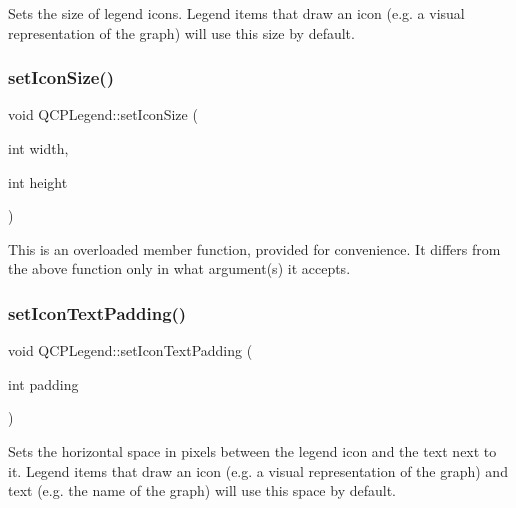 Sets the size of legend icons. Legend items that draw an icon (e.\+g. a visual representation of the graph) will use this size by default. \mbox{\label{class_q_c_p_legend_a96b1a37fd4ee6a9778e6e54fe56ab6c2}} 
\subsubsection{\texorpdfstring{set\+Icon\+Size()}{setIconSize()}\hspace{0.1cm}{\footnotesize\ttfamily [2/2]}}
{\footnotesize\ttfamily void Q\+C\+P\+Legend\+::set\+Icon\+Size (\begin{DoxyParamCaption}\item[{int}]{width,  }\item[{int}]{height }\end{DoxyParamCaption})}

This is an overloaded member function, provided for convenience. It differs from the above function only in what argument(s) it accepts. \mbox{\label{class_q_c_p_legend_a62973bd69d5155e8ea3141366e8968f6}} 
\subsubsection{\texorpdfstring{set\+Icon\+Text\+Padding()}{setIconTextPadding()}}
{\footnotesize\ttfamily void Q\+C\+P\+Legend\+::set\+Icon\+Text\+Padding (\begin{DoxyParamCaption}\item[{int}]{padding }\end{DoxyParamCaption})}

Sets the horizontal space in pixels between the legend icon and the text next to it. Legend items that draw an icon (e.\+g. a visual representation of the graph) and text (e.\+g. the name of the graph) will use this space by default. \mbox{\label{class_q_c_p_legend_a9ce60aa8bbd89f62ae4fa83ac6c60110}} 
